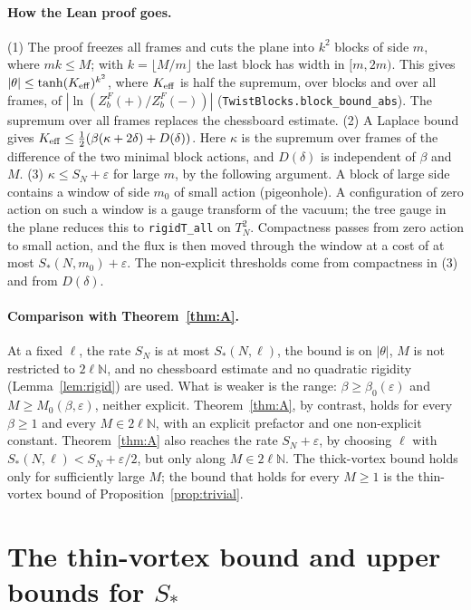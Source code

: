 \documentclass[11pt,a4paper]{article}
\theoremstyle{definition}
\theoremstyle{remark}
\newcommand{\code}[1]{\texttt{#1}}
\begin{document}
\paragraph{How the Lean proof goes.}
(1) The proof freezes all frames and cuts the plane into $k^2$ blocks of side $m$, where $mk\le M$; with $k=\lfloor M/m\rfloor$ the last block has width in $[m,2m)$.
This gives $|\theta|\le\tanh(K_{\rm eff})^{k^2}$, where $K_{\rm eff}$ is half the supremum, over blocks and over all frames, of $|\ln(Z^F_b(+)/Z^F_b(-))|$ (\code{TwistBlocks.block\_bound\_abs}).
The supremum over all frames replaces the chessboard estimate.
(2) A Laplace bound gives $K_{\rm eff}\le\frac12(\beta(\kappa+2\delta)+D(\delta))$.
Here $\kappa$ is the supremum over frames of the difference of the two minimal block actions, and $D(\delta)$ is independent of $\beta$ and $M$.
(3) $\kappa\le S_N+\varepsilon$ for large $m$, by the following argument.
A block of large side contains a window of side $m_0$ of small action (pigeonhole).
A configuration of zero action on such a window is a gauge transform of the vacuum; the tree gauge in the plane reduces this to \code{rigidT\_all} on $T^2_N$.
Compactness passes from zero action to small action, and the flux is then moved through the window at a cost of at most $S_*(N,m_0)+\varepsilon$.
The non-explicit thresholds come from compactness in (3) and from $D(\delta)$.

\paragraph{Comparison with Theorem~\ref{thm:A}.}
At a fixed $\ell$, the rate $S_N$ is at most $S_*(N,\ell)$, the bound is on $|\theta|$, $M$ is not restricted to $2\ell\mathbb{N}$, and no chessboard estimate and no quadratic rigidity (Lemma~\ref{lem:rigid}) are used. What is weaker is the range: $\beta\ge\beta_0(\varepsilon)$ and $M\ge M_0(\beta,\varepsilon)$, neither explicit.
Theorem~\ref{thm:A}, by contrast, holds for every $\beta\ge1$ and every $M\in2\ell\mathbb{N}$, with an explicit prefactor and one non-explicit constant.
Theorem~\ref{thm:A} also reaches the rate $S_N+\varepsilon$, by choosing $\ell$ with $S_*(N,\ell)<S_N+\varepsilon/2$, but only along $M\in2\ell\mathbb{N}$.
The thick-vortex bound holds only for sufficiently large $M$; the bound that holds for every $M\ge1$ is the thin-vortex bound of Proposition~\ref{prop:trivial}.

\section{The thin-vortex bound and upper bounds for $S_*$}\label{sec:numbers}
\end{document}
